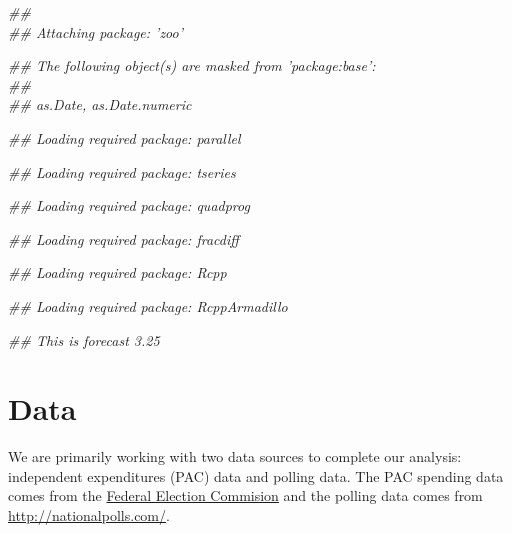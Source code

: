 \documentclass[11pt]{article}\usepackage{graphicx, color}
\makeatletter
\newenvironment{kframe}{%
 \def\at@end@of@kframe{}%
 \ifinner\ifhmode%
  \def\at@end@of@kframe{\end{minipage}}%
  \begin{minipage}{\columnwidth}%
 \fi\fi%
 \def\FrameCommand##1{\hskip\@totalleftmargin \hskip-\fboxsep
 \colorbox{shadecolor}{##1}\hskip-\fboxsep
     \hskip-\linewidth \hskip-\@totalleftmargin \hskip\columnwidth}%
 \MakeFramed {\advance\hsize-\width
   \@totalleftmargin\z@ \linewidth\hsize
   \@setminipage}}%
 {\par\unskip\endMakeFramed%
 \at@end@of@kframe}
\newenvironment{knitrout}{}{} %
\makeatother
\begin{document}
\begin{knitrout}
\color{fgcolor}\begin{kframe}


{\ttfamily\noindent\itshape\textcolor{messagecolor}{\#\# \\\#\# Attaching package: 'zoo'}}

{\ttfamily\noindent\itshape\textcolor{messagecolor}{\#\# The following object(s) are masked from 'package:base':\\\#\# \\\#\#     as.Date, as.Date.numeric}}

{\ttfamily\noindent\itshape\textcolor{messagecolor}{\#\# Loading required package: parallel}}

{\ttfamily\noindent\itshape\textcolor{messagecolor}{\#\# Loading required package: tseries}}

{\ttfamily\noindent\itshape\textcolor{messagecolor}{\#\# Loading required package: quadprog}}

{\ttfamily\noindent\itshape\textcolor{messagecolor}{\#\# Loading required package: fracdiff}}

{\ttfamily\noindent\itshape\textcolor{messagecolor}{\#\# Loading required package: Rcpp}}

{\ttfamily\noindent\itshape\textcolor{messagecolor}{\#\# Loading required package: RcppArmadillo}}

{\ttfamily\noindent\itshape\textcolor{messagecolor}{\#\# This is forecast 3.25}}\end{kframe}
\end{knitrout}




\section{Data}
We are primarily working with two data sources to complete our analysis: independent expenditures (PAC) data and polling data. The PAC spending data comes from the \href{http://www.fec.gov/data/IndependentExpenditure.do?format=html&cf=superPAC}{Federal Election Commision} and the polling data comes from \url{http://nationalpolls.com/}. 
\end{document}
